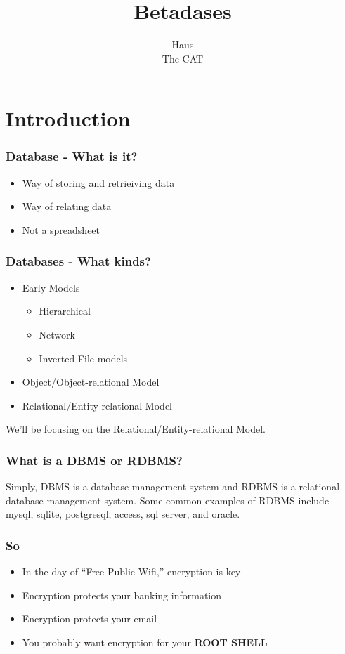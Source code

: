 \documentclass{beamer}
\title{Betadases}
\author{
Haus \\
The CAT
}
\begin{document}
\begin{frame}
  \titlepage
\end{frame}

\section{Introduction}

\begin{frame}
  \frametitle{Database - What is it?}
  \begin{itemize}
    \item Way of storing and retrieiving data
    \item Way of relating data
    \item Not a spreadsheet
  \end{itemize}
\end{frame}

\begin{frame}
  \frametitle{Databases - What kinds?}
  \begin{itemize}
    \item Early Models
    \begin{itemize}
      \item Hierarchical
      \item Network
      \item Inverted File models
    \end{itemize}
    \item Object/Object-relational Model
    \item Relational/Entity-relational Model
  \end{itemize}
	\pause
	We'll be focusing on the Relational/Entity-relational Model.
\end{frame}

\begin{frame}
  \frametitle{What is a DBMS or RDBMS?}
Simply, DBMS is a database management system and RDBMS is a relational database management system. Some common examples of RDBMS include mysql, sqlite, postgresql, access, sql server, and oracle.
\end{frame}

\begin{frame}
  \frametitle{So }
  \begin{itemize}
    \item In the day of ``Free Public Wifi,'' encryption is key
    \item Encryption protects your banking information
    \item Encryption protects your email
    \item You probably want encryption for your {\bf ROOT SHELL}
  \end{itemize}
\end{frame}
\end{document}
